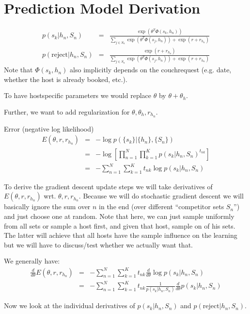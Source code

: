 \section{Prediction Model Derivation}

\begin{eqnarray}
p(s_k | h_n, S_n) &=& \frac{\exp(\theta^T \Phi(s_k,h_n))}{\sum_{j \in S_n} \exp(\theta^T \Phi(s_j,h_n)) + \exp(r + r_{h_n})} \\
p(\text{reject} | h_n, S_n) &=& \frac{\exp(r+r_{h_n})}{\sum_{j \in S_n} \exp(\theta^T \Phi(s_j,h_n)) + \exp(r + r_{h_n})}
\end{eqnarray}
Note that $\Phi(s_k,h_n)$ also implicitly depends on the couchrequest (e.g. date, whether the host is already booked, etc.).

To have hostspecific parameters we would replace $\theta$ by $\theta + \theta_h$. 

Further, we want to add regularization for $\theta, \theta_h, r_{h_n}$.

Error (negative log likelihood)
\begin{eqnarray}
E(\theta, r, r_{h_n}) &=& - \log p(\{s_k\} | \{h_n\}, \{S_n\})\\
&=& - \log [ \prod_{n=1}^N \prod_{k=1}^K p(s_k | h_n, S_n)^{t_{nk}}]\\
&=&  - \sum_{n=1}^N \sum_{k=1}^K t_{nk} \log p(s_k | h_n, S_n)
\end{eqnarray}

To derive the gradient descent update steps we will take derivatives of $E(\theta, r, r_{h_n})$ wrt. $\theta, r, r_{h_n}$. Because we will do stochastic gradient descent we will basically ignore the sum over $n$ in the end (over different ``competitor sets $S_n$'') and just choose one at random. Note that here, we can just sample uniformly from all sets or sample a host first, and given that host, sample on of his sets. The latter will achieve that all hosts have the sample influence on the learning but we will have to discuss/test whether we actually want that.

We generally have:
\begin{eqnarray}
\frac{d}{d \theta} E(\theta, r, r_{h_n}) &=& - \sum_{n=1}^N \sum_{k=1}^K t_{nk} \frac{d}{d \theta}  \log p(s_k | h_n, S_n) \\
&=& - \sum_{n=1}^N \sum_{k=1}^K t_{nk} \frac{1}{p(s_k | h_n, S_n)} \frac{d}{d \theta} p(s_k | h_n, S_n)
\end{eqnarray}

Now we look at the individual derivatives of $p(s_k | h_n, S_n)$ and $p(\text{reject} | h_n, S_n)$.

